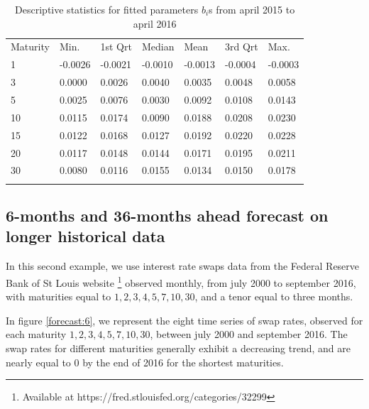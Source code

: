 \begin{table}
\begin{center}
\caption{Descriptive statistics for fitted parameters $b_i$s from april 2015 to april 2016}
\label{tab:realdatatables2}       %
\begin{tabular}{lllllll}
\hline\noalign{\smallskip}
Maturity & Min. & 1st Qrt & Median & Mean & 3rd Qrt & Max.\\
\noalign{\smallskip}\hline\noalign{\smallskip}
  1  & -0.0026 & -0.0021 & -0.0010 & -0.0013 & -0.0004  & -0.0003\\
  3  & 0.0000  & 0.0026  & 0.0040  & 0.0035  & 0.0048  & 0.0058\\
  5  & 0.0025  & 0.0076  & 0.0030  & 0.0092  & 0.0108  & 0.0143\\
  10 & 0.0115  & 0.0174  & 0.0090  & 0.0188  & 0.0208  & 0.0230\\
  15 & 0.0122  & 0.0168  & 0.0127  & 0.0192  & 0.0220  & 0.0228\\
  20 & 0.0117  & 0.0148  & 0.0144  & 0.0171  & 0.0195  & 0.0211\\
  30 & 0.0080  & 0.0116  & 0.0155  & 0.0134  & 0.0150  & 0.0178\\
\noalign{\smallskip}\hline
\end{tabular}
\end{center}
\end{table}

\subsection{6-months and 36-months ahead forecast on longer historical data}
\label{forecastexample2}

In this second example, we use interest rate swaps data from the Federal Reserve Bank of St Louis website \footnote{Available at https://fred.stlouisfed.org/categories/32299} observed monthly, from july 2000 to september 2016, with maturities equal to $1, 2, 3, 4, 5, 7, 10, 30$, and a tenor equal to three months. 

\medskip

In figure \ref{forecast:6}, we represent the eight time series of swap rates, observed for each maturity $1, 2, 3, 4, 5, 7, 10, 30$, between july 2000 and september 2016. The swap rates for different maturities generally exhibit a decreasing trend, and are nearly equal to 0 by the end of 2016 for the shortest maturities. 

